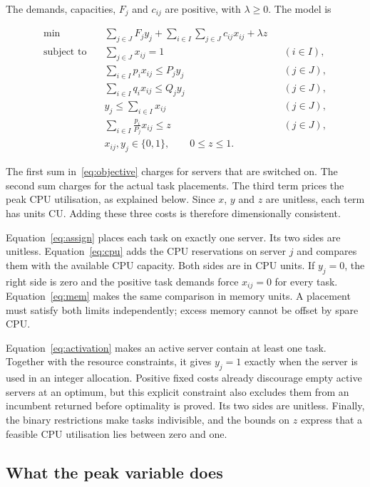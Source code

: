 \documentclass[10pt,a4paper]{article}
\begin{document}
The demands, capacities, $F_j$ and $c_{ij}$ are positive, with $\lambda\geq0$.
The model is

\begin{align}
\min\quad & \sum_{j\in J}F_jy_j+
             \sum_{i\in I}\sum_{j\in J}c_{ij}x_{ij}+\lambda z
             \label{eq:objective}\\
\text{subject to}\quad
& \sum_{j\in J}x_{ij}=1 &&(i\in I),\label{eq:assign}\\
& \sum_{i\in I}p_ix_{ij}\leq P_jy_j &&(j\in J),\label{eq:cpu}\\
& \sum_{i\in I}q_ix_{ij}\leq Q_jy_j &&(j\in J),\label{eq:mem}\\
& y_j\leq\sum_{i\in I}x_{ij} &&(j\in J),\label{eq:activation}\\
& \sum_{i\in I}\frac{p_i}{P_j}x_{ij}\leq z &&(j\in J),\label{eq:peak}\\
& x_{ij},y_j\in\{0,1\},\qquad 0\leq z\leq1.\nonumber
\end{align}

The first sum in~\eqref{eq:objective} charges for servers that are switched on.
The second sum charges for the actual task placements. The third term prices
the peak CPU utilisation, as explained below. Since $x$, $y$ and $z$ are
unitless, each term has units CU. Adding these three costs is therefore
dimensionally consistent.

Equation~\eqref{eq:assign} places each task on exactly one server. Its two sides
are unitless. Equation~\eqref{eq:cpu} adds the CPU reservations on server $j$
and compares them with the available CPU capacity. Both sides are in CPU units.
If $y_j=0$, the right side is zero and the positive task demands force
$x_{ij}=0$ for every task. Equation~\eqref{eq:mem} makes the same comparison
in memory units. A placement must satisfy both limits independently; excess
memory cannot be offset by spare CPU.

Equation~\eqref{eq:activation} makes an active server contain at least one task.
Together with the resource constraints, it gives $y_j=1$ exactly when the server
is used in an integer allocation. Positive fixed costs already discourage empty
active servers at an optimum, but this explicit constraint also excludes them
from an incumbent returned before optimality is proved. Its two sides are
unitless. Finally, the binary restrictions make tasks indivisible, and the
bounds on $z$ express that a feasible CPU utilisation lies between zero and one.

\subsection{What the peak variable does}
\end{document}
